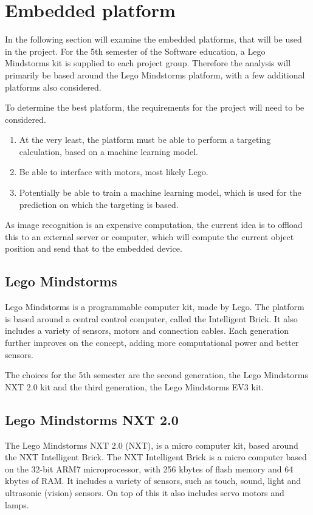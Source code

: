 \section{Embedded platform}
In the following section will examine the embedded platforms, that will be used in the project.
For the 5th semester of the Software education, a Lego Mindstorms kit is supplied to each project group.
Therefore the analysis will primarily be based around the Lego Mindstorms platform, with a few additional platforms also considered.

To determine the best platform, the requirements for the project will need to be considered.
\begin{enumerate}
	\item At the very least, the platform must be able to perform a targeting calculation, based on a machine learning model.
	\item Be able to interface with motors, most likely Lego.
	\item Potentially be able to train a machine learning model, which is used for the prediction on which the targeting is based.
\end{enumerate}

As image recognition is an expensive computation, the current idea is to offload this to an external server or computer, which will compute the current object position and send that to the embedded device.

\subsection{Lego Mindstorms}
Lego Mindstorms is a programmable computer kit, made by Lego.
The platform is based around a central control computer, called the Intelligent Brick.
It also includes a variety of sensors, motors and connection cables.
Each generation further improves on the concept, adding more computational power and better sensors.

The choices for the 5th semester are the second generation, the Lego Mindstorms NXT 2.0 kit and the third generation, the Lego Mindstorms EV3 kit.

\subsection{Lego Mindstorms NXT 2.0}
The Lego Mindstorms NXT 2.0 (NXT), is a micro computer kit, based around the NXT Intelligent Brick.
The NXT Intelligent Brick is a micro computer based on the 32-bit ARM7 microprocessor, with 256 kbytes of flash memory and 64 kbytes of RAM\cite{nxt2userguide}.
It includes a variety of sensors, such as touch, sound, light and ultrasonic (vision) sensors.
On top of this it also includes servo motors and lamps.


